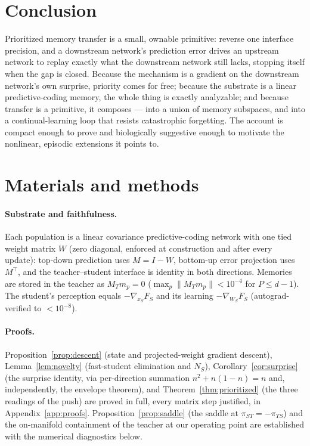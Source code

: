 \documentclass[10pt,letterpaper]{article}
\theoremstyle{plain}
\theoremstyle{remark}
\newcommand{\xS}{x_S}
\newcommand{\WS}{W_S}
\newcommand{\MT}{M_T}
\newcommand{\NS}{N_S}
\newcommand{\FS}{F_S}
\newcommand{\piTS}{\pi_{TS}}
\newcommand{\piST}{\pi_{ST}}
\newcommand{\tr}{^{\!\top}}
\begin{document}
\section{Conclusion}
Prioritized memory transfer is a small, ownable primitive: reverse one interface precision, and a
downstream network's prediction error drives an upstream network to replay exactly what the downstream
network still lacks, stopping itself when the gap is closed. Because the mechanism is a gradient on the
downstream network's own surprise, priority comes for free; because the substrate is a linear
predictive-coding memory, the whole thing is exactly analyzable; and because transfer is a primitive, it
composes --- into a union of memory subspaces, and into a continual-learning loop that resists
catastrophic forgetting. The account is compact enough to prove and biologically suggestive enough to
motivate the nonlinear, episodic extensions it points to.

\section*{Materials and methods}
\paragraph{Substrate and faithfulness.} Each population is a linear covariance predictive-coding network
with one tied weight matrix $W$ (zero diagonal, enforced at construction and after every update):
top-down prediction uses $M=I-W$, bottom-up error projection uses $M\tr$, and the teacher--student
interface is identity in both directions. Memories are stored in the teacher as $\MT m_p=0$
($\max_p\|\MT m_p\|<10^{-4}$ for $P\le d-1$). The student's perception equals $-\nabla_{\xS}\FS$ and its
learning $-\nabla_{\WS}\FS$ (autograd-verified to $<10^{-8}$).

\paragraph{Proofs.} Proposition~\ref{prop:descent} (state and projected-weight gradient descent),
Lemma~\ref{lem:novelty} (fast-student elimination and $\NS$), Corollary~\ref{cor:surprise} (the surprise
identity, via per-direction summation $n^2+n(1-n)=n$ and, independently, the envelope theorem), and
Theorem~\ref{thm:prioritized} (the three readings of the push) are proved in full, every matrix step
justified, in Appendix~\ref{app:proofs}. Proposition~\ref{prop:saddle} (the saddle at $\piST=-\piTS$)
and the on-manifold containment of the teacher at our operating point are established with the
numerical diagnostics below.
\end{document}
